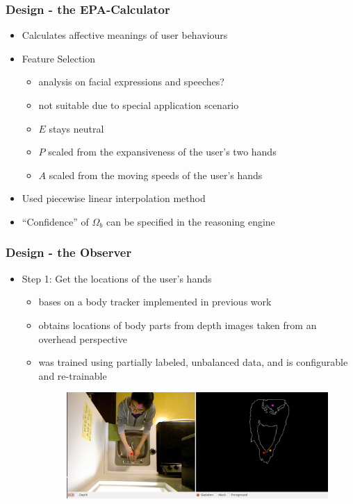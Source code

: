 \documentclass{beamer}
\begin{document}
\begin{frame}
\frametitle{Design - the EPA-Calculator}
\begin{itemize}
\item Calculates affective meanings of user behaviours
\vspace{.3cm}
\item Feature Selection
\begin{itemize}
\item analysis on facial expressions and speeches?
\item not suitable due to special application scenario
\item $E$ stays neutral
\item $P$ scaled from the expansiveness of the user's two hands
\item $A$ scaled from the moving speeds of the user's hands
\end{itemize}
\vspace{.3cm}
\item Used piecewise linear interpolation method
\vspace{.3cm}
\item ``Confidence'' of $\Omega_b$ can be specified in the reasoning engine
\end{itemize}
\end{frame}


\begin{frame}
\frametitle{Design - the Observer}
\begin{itemize}
\item Step 1: Get the locations of the user's hands
\begin{itemize}
\item bases on a body tracker implemented in previous work
\item obtains locations of body parts from depth images taken from an overhead perspective
\item was trained using partially labeled, unbalanced data, and is configurable and re-trainable
\begin{figure}[htb]
\centering
\includegraphics[width=0.9\linewidth]{fig/handtracker-performance.png}
\end{figure}
\end{itemize}
\end{itemize}
\end{frame}
\end{document}
